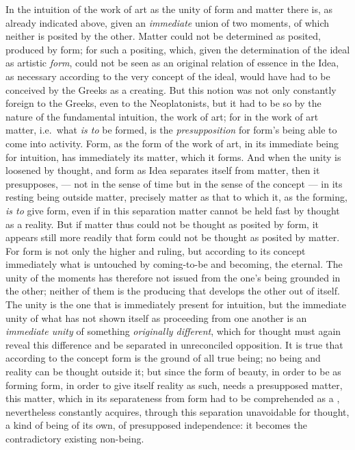 In the intuition of the work of art as the unity of form and matter there is,
as already indicated above, given an \emph{immediate} union of two
moments, of which neither is posited by the other. Matter could not be
determined as posited, produced by form; for such a positing, which, given the
determination of the ideal as artistic \emph{form}, could not be seen as an
original relation of essence in the Idea, as necessary according to the very
concept of the ideal, would have had to be conceived by the Greeks as a
creating. But this notion was not only constantly foreign to the Greeks, even
to the Neoplatonists, but it had to be so by the nature of the fundamental
intuition, the work of art; for in the work of art matter, i.e.\ what
\emph{is to} be formed, is the \emph{presupposition} for form's being able to
come into activity. Form, as the form of the work of art, in its immediate
being for intuition, has immediately its matter, which it forms. And when the
unity is loosened by thought, and form as Idea separates itself from matter,
then it presupposes, --- not in the sense of time but in the sense of the
concept --- in its resting being outside matter, precisely matter as that to
which it, as the forming, \emph{is to} give form, even if in this separation
matter cannot be held fast by thought as a reality. But if matter thus could
not be thought as posited by form, it appears still more readily that form
could not be thought as posited by matter. For form is not only the higher and
ruling, but according to its concept immediately what is untouched by
coming-to-be and becoming, the eternal. The unity of the moments has therefore
not issued from the one's being grounded in the other; neither of them is the
producing that develops the other out of itself. The unity is the one that is
immediately present for intuition, but the immediate unity of what has not
shown itself as proceeding from one another is an \emph{immediate unity} of
something \emph{originally different}, which for thought must again reveal
this difference and be separated in unreconciled opposition. It is true that
according to the concept form is the ground of all true being; no being and
reality can be thought outside it; but since the form of beauty, in order to
be as forming form, in order to give itself reality as such, needs a
presupposed matter, this matter, which in its separateness from form
had to be comprehended as a , nevertheless constantly acquires,
through this separation unavoidable for thought, a kind of being of its own,
of presupposed independence: it becomes the contradictory existing non-being.

